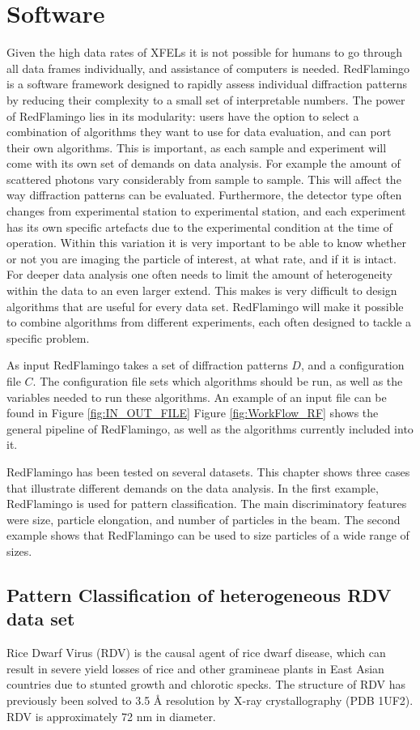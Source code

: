 \section{Software}
Given the high data rates of XFELs it is not possible for humans to go through all data frames individually, and assistance of computers is needed.
RedFlamingo is a software framework designed to rapidly assess individual diffraction patterns by reducing their complexity to a small set of interpretable numbers. The power of RedFlamingo lies in its modularity: users have the option to select a combination of algorithms they want to use for data evaluation, and can port their own algorithms. This is important, as each sample and experiment will come with its own set of demands on data analysis. For example the amount of scattered photons vary considerably from sample to sample. This will affect the way diffraction patterns can be evaluated. Furthermore, the detector type often changes from experimental station to experimental station, and each experiment has its own specific artefacts due to the experimental condition at the time of operation. Within this variation it is very important to be able to know whether or not you are imaging the particle of interest, at what rate, and if it is intact. For deeper data analysis one often needs to limit the amount of heterogeneity within the data to an even larger extend. This makes is very difficult to design algorithms that are useful for every data set. RedFlamingo will make it possible to combine algorithms from different experiments, each often designed to tackle a specific problem. 

As input RedFlamingo takes a set of diffraction patterns $D$, and a configuration file $C$. The configuration file sets which algorithms should be run, as well as the variables needed to run these algorithms. An example of an input file can be found in Figure \ref{fig:IN_OUT_FILE} Figure \ref{fig:WorkFlow_RF} shows the general pipeline of RedFlamingo, as well as the algorithms currently included into it.


RedFlamingo has been tested on several datasets. This chapter shows three cases that illustrate different demands on the data analysis. In the first example, RedFlamingo is used for pattern classification. The main discriminatory features were size, particle elongation, and number of particles in the beam. The second example shows that RedFlamingo can be used to size particles of a wide range of sizes.  

\subsection{Pattern Classification of heterogeneous RDV data set}
Rice Dwarf Virus (RDV) is the causal agent of rice dwarf disease, which can result in severe yield losses of rice and other gramineae plants in East Asian countries due to stunted growth and chlorotic specks. The structure of RDV has previously been solved to 3.5 Å resolution by X-ray crystallography \cite{Nakagawa2003} (PDB 1UF2). RDV is approximately 72 nm in diameter.

